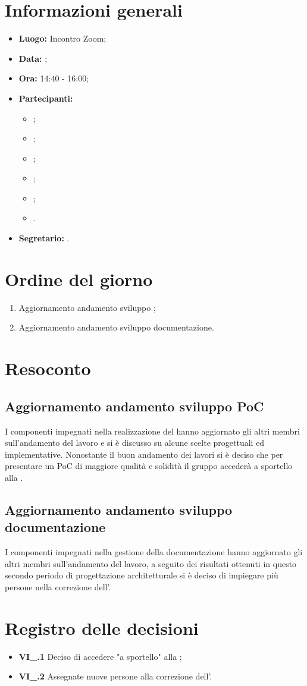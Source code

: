 \section{Informazioni generali}
\begin{itemize}
	\item \textbf{Luogo:} Incontro Zoom;
	\item \textbf{Data:} \Data;
	\item \textbf{Ora:} 14:40 - 16:00;
	\item \textbf{Partecipanti:}
	\begin{itemize}
		\item \BL{}; 
		\item \FF{};
		\item \MM{}; 
		\item \PC{};
		\item \TG{};
		\item \TL{}.
	\end{itemize} 
	\item \textbf{Segretario:} \TG{}.
\end{itemize}

\section{Ordine del giorno}
\begin{enumerate}
	\item Aggiornamento andamento sviluppo ;
	\item Aggiornamento andamento sviluppo documentazione.
\end{enumerate}

\section{Resoconto}
\subsection{Aggiornamento andamento sviluppo PoC}
I componenti impegnati nella realizzazione del  hanno aggiornato gli altri membri sull'andamento del lavoro e si è discusso su alcune scelte progettuali ed implementative. Nonostante il buon andamento dei lavori si è deciso che per presentare un PoC di maggiore qualità e solidità il gruppo accederà a sportello alla .
\subsection{Aggiornamento andamento sviluppo documentazione}
I componenti impegnati nella gestione della documentazione hanno aggiornato gli altri membri sull'andamento del lavoro, a seguito dei risultati ottenuti in questo secondo periodo di progettazione architetturale si è deciso di impiegare più persone nella correzione dell'\AdR{}.

\section{Registro delle decisioni}
\begin{itemize}
	\item \textbf{VI\_\Data.1} Deciso di accedere "a sportello" alla ;
	\item \textbf{VI\_\Data.2} Assegnate nuove persone alla correzione dell'\AdR{}.
\end{itemize}